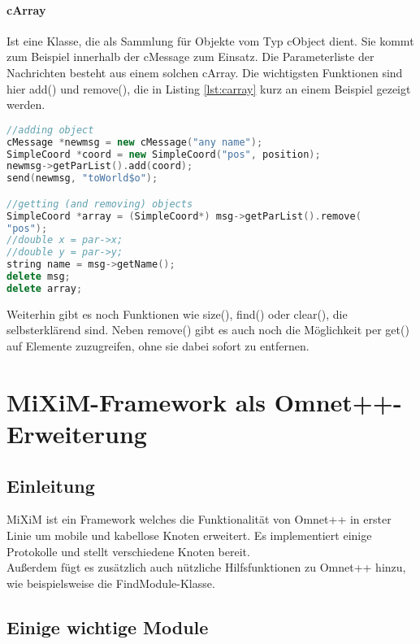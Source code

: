 \paragraph{cArray} Ist eine Klasse, die als Sammlung für Objekte vom Typ cObject dient. Sie kommt zum Beispiel innerhalb der cMessage zum Einsatz. Die Parameterliste der Nachrichten besteht aus einem solchen cArray. Die wichtigsten Funktionen sind hier add() und remove(), die in Listing \ref{lst:carray} kurz an einem Beispiel gezeigt werden.

\begin{minipage}{\textwidth}
\begin{lstlisting}[language=C++,caption={cArray add und remove},label=lst:carray]
//adding object
cMessage *newmsg = new cMessage("any name");
SimpleCoord *coord = new SimpleCoord("pos", position);
newmsg->getParList().add(coord);
send(newmsg, "toWorld$o");

//getting (and removing) objects
SimpleCoord *array = (SimpleCoord*) msg->getParList().remove(
"pos");
//double x = par->x;
//double y = par->y;
string name = msg->getName();
delete msg;
delete array;

\end{lstlisting}
\end{minipage}

Weiterhin gibt es noch Funktionen wie size(), find() oder clear(), die selbsterklärend sind. Neben remove() gibt es auch noch die Möglichkeit per get() auf Elemente zuzugreifen, ohne sie dabei sofort zu entfernen.

\section{MiXiM-Framework als Omnet++-Erweiterung}

\subsection{Einleitung}

MiXiM\cite{mixim} ist ein Framework welches die Funktionalität von Omnet++ in erster Linie um mobile und kabellose Knoten erweitert. Es implementiert einige Protokolle und stellt verschiedene Knoten bereit.\\
Außerdem fügt es zusätzlich auch nützliche Hilfsfunktionen zu Omnet++ hinzu, wie beispielsweise die FindModule-Klasse.

\subsection{Einige wichtige Module}

